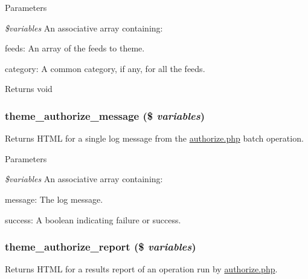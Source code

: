 \begin{DoxyParams}{Parameters}
\item[{\em \$variables}]An associative array containing:
\begin{DoxyItemize}
\item feeds: An array of the feeds to theme.
\item category: A common category, if any, for all the feeds.
\end{DoxyItemize}\end{DoxyParams}
\begin{DoxyReturn}{Returns}
void 
\end{DoxyReturn}
\hypertarget{group__themeable_ga56220e4ed7d88deb60333c0013ba72a6}{
\subsubsection[{theme\_\-authorize\_\-message}]{\setlength{\rightskip}{0pt plus 5cm}theme\_\-authorize\_\-message (\$ {\em variables})}}
\label{group__themeable_ga56220e4ed7d88deb60333c0013ba72a6}
Returns HTML for a single log message from the \hyperlink{authorize_8php}{authorize.php} batch operation.


\begin{DoxyParams}{Parameters}
\item[{\em \$variables}]An associative array containing:
\begin{DoxyItemize}
\item message: The log message.
\item success: A boolean indicating failure or success. 
\end{DoxyItemize}\end{DoxyParams}
\hypertarget{group__themeable_gae1d7d2ad7f9c1e0be407bd99960811fd}{
\subsubsection[{theme\_\-authorize\_\-report}]{\setlength{\rightskip}{0pt plus 5cm}theme\_\-authorize\_\-report (\$ {\em variables})}}
\label{group__themeable_gae1d7d2ad7f9c1e0be407bd99960811fd}
Returns HTML for a results report of an operation run by \hyperlink{authorize_8php}{authorize.php}.


